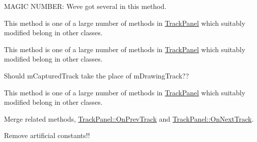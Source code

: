\begin{DoxyRefList}
\item[\label{todo__todo000053}%
\hypertarget{todo__todo000053}{}%
Member \hyperlink{class_track_panel_a81709530372aa825194618eca5e6b6c2}{Track\+Panel\+:\+:Do\+Zoom\+In\+Out} (wx\+Mouse\+Event \&event, int x)]M\+A\+G\+IC N\+U\+M\+B\+ER\+: We\textquotesingle{}ve got several in this method.  
\item[\label{todo__todo000056}%
\hypertarget{todo__todo000056}{}%
Member \hyperlink{class_track_panel_a984cfefe6eb6bcc49b44d1b2346ef166}{Track\+Panel\+:\+:Handle\+Glyph\+Drag\+Release} (\hyperlink{class_label_track}{Label\+Track} $\ast$l\+Track, wx\+Mouse\+Event \&event)]This method is one of a large number of methods in \hyperlink{class_track_panel}{Track\+Panel} which suitably modified belong in other classes.  
\item[\label{todo__todo000055}%
\hypertarget{todo__todo000055}{}%
Member \hyperlink{class_track_panel_aa9dd18c1cdb37737045a87617db85323}{Track\+Panel\+:\+:Handle\+Label\+Track\+Click} (\hyperlink{class_label_track}{Label\+Track} $\ast$l\+Track, wx\+Rect \&rect, wx\+Mouse\+Event \&event)]This method is one of a large number of methods in \hyperlink{class_track_panel}{Track\+Panel} which suitably modified belong in other classes.  
\item[\label{todo__todo000054}%
\hypertarget{todo__todo000054}{}%
Member \hyperlink{class_track_panel_a701733b821a60732c8c4d66676b8b5b1}{Track\+Panel\+:\+:Handle\+Sample\+Editing\+Click} (wx\+Mouse\+Event \&event)]Should m\+Captured\+Track take the place of m\+Drawing\+Track??  
\item[\label{todo__todo000057}%
\hypertarget{todo__todo000057}{}%
Member \hyperlink{class_track_panel_a39f65a04ecb950f794590d58261ab133}{Track\+Panel\+:\+:Handle\+Text\+Drag\+Release} (\hyperlink{class_label_track}{Label\+Track} $\ast$l\+Track, wx\+Mouse\+Event \&event)]This method is one of a large number of methods in \hyperlink{class_track_panel}{Track\+Panel} which suitably modified belong in other classes.  
\item[\label{todo__todo000058}%
\hypertarget{todo__todo000058}{}%
Member \hyperlink{class_track_panel_a47315148ac50d0e24e7d88148973c8c4}{Track\+Panel\+:\+:On\+Prev\+Track} (bool shift=false)]Merge related methods, \hyperlink{class_track_panel_a47315148ac50d0e24e7d88148973c8c4}{Track\+Panel\+::\+On\+Prev\+Track} and \hyperlink{class_track_panel_ae6a78ddc3629f49a13437566200a4f95}{Track\+Panel\+::\+On\+Next\+Track}.  
\item[\label{todo__todo000059}%
\hypertarget{todo__todo000059}{}%
Member \hyperlink{class_track_panel_a3b538964a9818c509d22f76d14629981}{Track\+Panel\+:\+:On\+Rate\+Other} (wx\+Command\+Event \&event)]Remove artificial constants!! 


\end{DoxyRefList}
